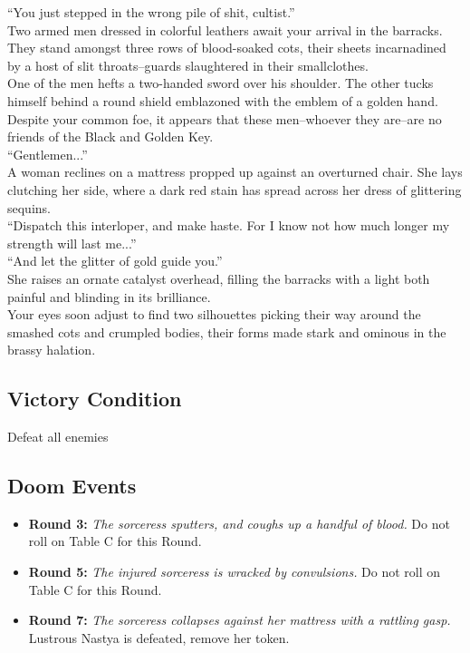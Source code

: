 “You just stepped in the wrong pile of shit, cultist.”\\

Two armed men dressed in colorful leathers await your arrival in the barracks. They stand amongst three rows of blood-soaked cots, their sheets incarnadined by a host of slit throats--guards slaughtered in their smallclothes.\\

One of the men hefts a two-handed sword over his shoulder. The other tucks himself behind a round shield emblazoned with the emblem of a golden hand. Despite your common foe, it appears that these men--whoever they are--are no friends of the Black and Golden Key.\\

“Gentlemen...”\\

A woman reclines on a mattress propped up against an overturned chair. She lays clutching her side, where a dark red stain has spread across her dress of glittering sequins.\\

“Dispatch this interloper, and make haste. For I know not how much longer my strength will last me...”\\

“And let the glitter of gold guide you.”\\
She raises an ornate catalyst overhead, filling the barracks with a light both painful and blinding in its brilliance.\\

Your eyes soon adjust to find two silhouettes picking their way around the smashed cots and crumpled bodies, their forms made stark and ominous in the brassy halation.\\

\subsection*{Victory Condition}
Defeat all enemies

\subsection*{Doom Events}
\begin{itemize}
\item \textbf{Round 3:} \emph{The sorceress sputters, and coughs up a handful of blood.} Do not roll on Table C for this Round.
\item \textbf{Round 5:} \emph{The injured sorceress is wracked by convulsions.} Do not roll on Table C for this Round.
\item \textbf{Round 7:} \emph{The sorceress collapses against her mattress with a rattling gasp.} Lustrous Nastya is defeated, remove her token.
\end{itemize}

